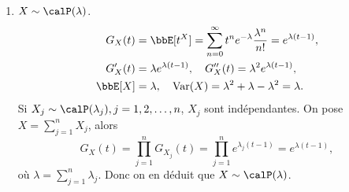 \begin{exem}
\begin{enumerate}
        \item $X \sim \calP(\lambda)$.
              \begin{align*}
                  G_X(t)  & = \bbE[t^X] = \sum_{n = 0}^\infty t^ne^{-\lambda} \frac{\lambda^n}{n!} = e^{\lambda(t - 1)}, \\
                  G_X'(t) & = \lambda e^{\lambda(t - 1)}, \quad G_X''(t) = \lambda^2 e^{\lambda(t - 1)},                 \\
                  \bbE[X] & = \lambda, \quad \var(X) = \lambda^2 + \lambda - \lambda^2 = \lambda.
              \end{align*}
              Si $X_j \sim \calP(\lambda_j), j = 1, 2, \ldots, n$, $X_j$ sont indépendantes.
              On pose $X = \sum\limits_{j = 1}^n X_j$, alors
              \[ G_X(t) = \prod_{j = 1}^n G_{X_j}(t) = \prod_{j = 1}^n e^{\lambda_j (t - 1)} = e^{\lambda (t - 1)}, \]
              où $\lambda = \sum\limits_{j = 1}^n \lambda_j$.
              Donc on en déduit que $X \sim \calP(\lambda)$.
    \end{enumerate}
\end{exem}
